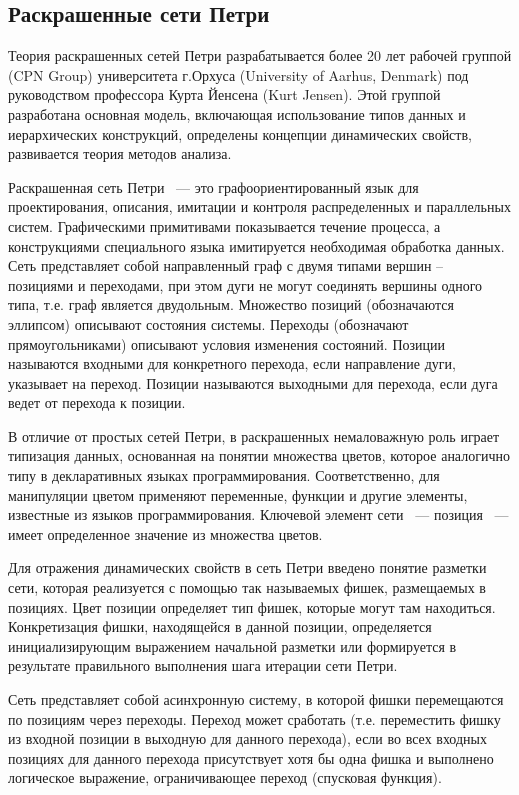 \begin{center}
\begin{longtable}{|p{}|p{}|p{}|}
	\end{longtable}
\end{center}

\subsection{Раскрашенные сети Петри}

Теория раскрашенных сетей Петри разрабатывается более 20 лет рабочей группой (CPN Group) университета г.Орхуса (University of Aarhus, Denmark) под руководством профессора Курта Йенсена (Kurt Jensen). Этой группой разработана основная модель, включающая использование типов данных и иерархических конструкций, определены концепции динамических свойств, развивается теория методов анализа.

Раскрашенная сеть Петри ~--- это графоориентированный язык для проектирования, описания, имитации и контроля распределенных и параллельных систем. Графическими примитивами показывается течение процесса, а конструкциями специального языка имитируется необходимая обработка данных. Сеть представляет собой направленный граф с двумя типами вершин – позициями и переходами, при этом дуги не могут соединять вершины одного типа, т.е. граф является двудольным. Множество позиций (обозначаются эллипсом) описывают состояния системы. Переходы (обозначают прямоугольниками) описывают условия изменения состояний. Позиции называются входными для конкретного перехода, если направление дуги, указывает на переход. Позиции называются выходными для перехода, если дуга ведет от перехода к позиции.

В отличие от простых сетей Петри, в раскрашенных немаловажную роль играет типизация данных, основанная на понятии множества цветов, которое аналогично типу в декларативных языках программирования. Соответственно, для манипуляции цветом применяют переменные, функции и другие элементы, известные из языков программирования. Ключевой элемент сети ~--- позиция ~--- имеет определенное значение из множества цветов. \cite{Shahov}

Для отражения динамических свойств в сеть Петри введено понятие разметки сети, которая реализуется с помощью так называемых фишек, размещаемых в позициях. Цвет позиции определяет тип фишек, которые могут там находиться. Конкретизация фишки, находящейся в данной позиции, определяется инициализирующим выражением начальной разметки или формируется в результате правильного выполнения шага итерации сети Петри.

Сеть представляет собой асинхронную систему, в которой фишки перемещаются по позициям через переходы. Переход может сработать (т.е. переместить фишку из входной позиции в выходную для данного перехода), если во всех входных позициях для данного перехода присутствует хотя бы одна фишка и выполнено логическое выражение, ограничивающее переход (спусковая функция).

